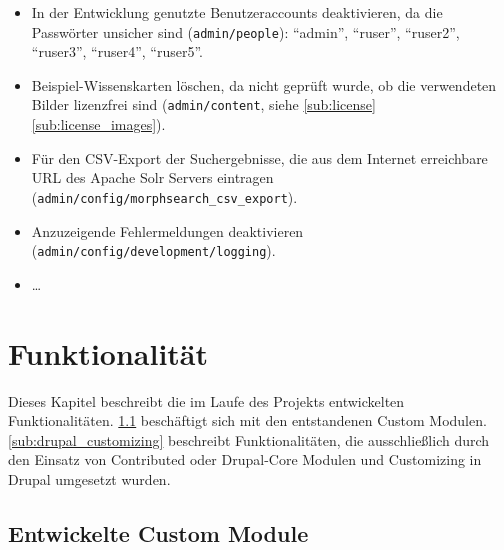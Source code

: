 \begin{itemize}
	\item In der Entwicklung genutzte Benutzeraccounts deaktivieren, da die Passwörter unsicher sind (\lstinline|admin/people|): \enquote{admin}, \enquote{ruser}, \enquote{ruser2}, \enquote{ruser3}, \enquote{ruser4}, \enquote{ruser5}.
	
	\item Beispiel-Wissenskarten löschen, da nicht geprüft wurde, ob die verwendeten Bilder lizenzfrei sind (\lstinline|admin/content|, siehe \cref*{sub:license} \cref{sub:license_images}).
	
	\item Für den CSV-Export der Suchergebnisse, die aus dem Internet erreichbare URL des Apache Solr Servers eintragen (\lstinline|admin/config/morphsearch_csv_export|).
	
	\item Anzuzeigende Fehlermeldungen deaktivieren (\lstinline|admin/config/development/logging|).
	
	\item \dots {}
\end{itemize}



\newpage
\section{Funktionalität}\label{sec:function}
Dieses Kapitel beschreibt die im Laufe des Projekts entwickelten Funktionalitäten. \cref{sub:custom_modules} beschäftigt sich mit den entstandenen Custom Modulen. \cref{sub:drupal_customizing} beschreibt Funktionalitäten, die ausschließlich durch den Einsatz von Contributed oder Drupal-Core Modulen und Customizing in Drupal umgesetzt wurden.


\subsection{Entwickelte Custom Module}\label{sub:custom_modules}


